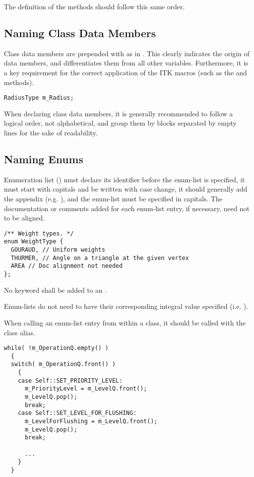 The definition of the methods should follow this same order.


\subsection{Naming Class Data Members}
\label{NamingClassDataMembers}

Class data members are prepended with  as in . This
clearly indicates the origin of data members, and differentiates them from all
other variables. Furthermore, it is a key requirement for the correct
application of the ITK macros (such as the  and
 methods).
\small
\begin{verbatim}
RadiusType m_Radius;
\end{verbatim}
\normalsize

When declaring class data members, it is generally recommended to follow a
logical order, not alphabetical, and group them by blocks separated by empty
lines for the sake of readability.


\subsection{Naming Enums}
\label{subsec:NamingEnums}

Enumeration list () must declare its identifier before the
enum-list is specified, it must start with capitals and be written with case
change, it should generally add the  appendix (e.g. ),
and the enum-list must be specified in capitals. The documentation or comments
added for each enum-list entry, if necessary, need not to be aligned.
\small
\begin{verbatim}
/** Weight types. */
enum WeightType {
  GOURAUD, // Uniform weights
  THURMER, // Angle on a triangle at the given vertex
  AREA // Doc alignment not needed
};
\end{verbatim}
\normalsize

No  keyword shall be added to an .

Enum-lists do not need to have their corresponding integral value specified
(i.e. ).

When calling an enum-list entry from within a class, it should be called with
the  class alias.
\small
\begin{verbatim}
while( !m_OperationQ.empty() )
  {
  switch( m_OperationQ.front() )
    {
    case Self::SET_PRIORITY_LEVEL:
      m_PriorityLevel = m_LevelQ.front();
      m_LevelQ.pop();
      break;
    case Self::SET_LEVEL_FOR_FLUSHING:
      m_LevelForFlushing = m_LevelQ.front();
      m_LevelQ.pop();
      break;

      ...
    }
  }
\end{verbatim}
\normalsize


